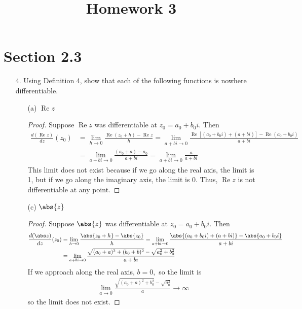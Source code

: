 \documentclass{article}
\DeclareMathOperator{\re}{Re}
\begin{document}
\title{Homework 3}
\maketitle
\thispagestyle{fancy}

\section*{Section 2.3}

\begin{itemize}
	\item[4.] Using Definition 4, show that each of the following functions is nowhere differentiable.
		\begin{itemize}
			\item[(a)] $\re z$
				\begin{proof}
					Suppose $\re z$ was differentiable at $z_0=a_0+b_0i.$ Then
					\begin{align*}
						\frac{d(\re z)}{dz} (z_0) &= \lim_{h\to 0}\frac{\re(z_0+h)-\re z}{h} = \lim_{a+bi\to 0}\frac{\re\left[ (a_0+b_0i)+(a+bi) \right] - \re(a_0+b_0i)}{a+bi} \\
						&= \lim_{a+bi\to 0}\frac{(a_0+a)-a_0}{a+bi} = \lim_{a+bi\to 0} \frac{a}{a+bi}
					\end{align*}
					This limit does not exist because if we go along the real axis, the limit is 1, but if we go along the imaginary axis, the limit is 0. Thus, $\re z$ is not differentiable at any point.
				\end{proof}

			\item[(c)] $\abs{z}$
				\begin{proof}
					Suppose $\abs{z}$ was differentiable at $z_0=a_0+b_0i.$ Then
					\begin{align*}
						\frac{d(\abs z)}{dz} (z_0) &= \lim_{h\to 0}\frac{\abs{z_0+h}-\abs{z_0}}{h} = \lim_{a+bi\to 0}\frac{\abs{(a_0+b_0i)+(a+bi)} - \abs{a_0+b_0i}}{a+bi} \\
						&= \lim_{a+bi\to 0} \frac{\sqrt{(a_0+a)^2+(b_0+b)^2}-\sqrt{a_0^2+b_0^2}}{a+bi}
					\end{align*}
					If we approach along the real axis, $b=0,$ so the limit is
					\begin{align*}
						\lim_{a\to 0} \frac{\sqrt{(a_0+a)^2+b_0^2}-\sqrt{a_0^2}}{a} \to\infty
					\end{align*}
					so the limit does not exist.
				\end{proof}

		\end{itemize}


\end{itemize}
\end{document}

